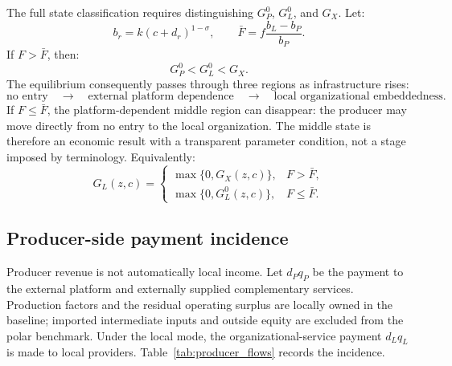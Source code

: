 \documentclass[11pt]{article}
\theoremstyle{definition}
\theoremstyle{remark}
\begin{document}
The full state classification requires distinguishing \(G_P^0\),
\(G_L^0\), and \(G_X\).  Let:
\begin{equation}
 b_r=k(c+d_r)^{1-\sigma},
 \qquad
 \bar F=f\frac{b_L-b_P}{b_P}.
 \label{eq:Fbar}
\end{equation}
If \(F>\bar F\), then:
\begin{equation}
 G_P^0<G_L^0<G_X.
 \label{eq:three_region_order}
\end{equation}
The equilibrium consequently passes through three regions as infrastructure
rises:
\[
\text{no entry}
\quad\longrightarrow\quad
\text{external platform dependence}
\quad\longrightarrow\quad
\text{local organizational embeddedness}.
\]
If \(F\leq\bar F\), the platform-dependent middle region can disappear:
the producer may move directly from no entry to the local organization.  The
middle state is therefore an economic result with a transparent parameter
condition, not a stage imposed by terminology.
Equivalently:
\begin{equation}
 G_L(z,c)
 =
 \begin{cases}
 \max\{0,G_X(z,c)\},&F>\bar F,\\
 \max\{0,G_L^0(z,c)\},&F\leq\bar F.
 \end{cases}
 \label{eq:embedding_threshold_piecewise}
\end{equation}

\subsection{Producer-side payment incidence}

Producer revenue is not automatically local income.  Let \(d_Pq_P\) be the
payment to the external platform and externally supplied complementary
services.  Production factors and the residual operating surplus are locally
owned in the baseline; imported intermediate inputs and outside equity are
excluded from the polar benchmark.  Under the local mode, the
organizational-service payment \(d_Lq_L\) is made to local providers.
Table~\ref{tab:producer_flows} records the incidence.
\end{document}
